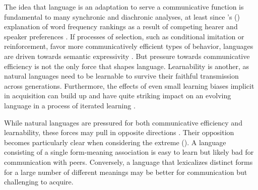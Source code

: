 \documentclass[a4paper, 11pt]{article}
\theoremstyle{Satz}
\newcommand{\citeposs}[2][]{\citeauthor{#2}'s (\citeyear[#1]{#2})}
\begin{document}
The idea that language is an adaptation to serve a communicative function is fundamental to
many synchronic and diachronic analyses, at least since \citeposs{zipf:1949} explanation of word
frequency rankings as a result of competing hearer and speaker preferences \citep[e.g.,
in][]{martinet:1962, horn:1984,jaeger+vRooij:2007,jaeger:2007,
  piantadosi:2014,kirby+etal:2015}. If processes of selection, such as conditional imitation or
reinforcement, favor more communicatively efficient types of behavior, languages are driven
towards semantic expressivity \citep[e.g.,][]{nowak+krakauer:1999,Skyrms2010:Signals}. But
pressure towards communicative efficiency is not the only force that shapes
language. Learnability is another, as natural languages need to be learnable to survive their
faithful transmission across generations. Furthermore, the effects of even small learning biases implicit in acquisition can build up and have quite striking impact on an evolving language in a process of iterated
learning
\citep{KirbyHurford2002:The-Emergence-o,SmithKirby2003:Iterated-Learni,kirby+etal:2014}.

While natural languages are pressured for both communicative efficiency and learnability, these forces may
pull in opposite directions \citep[\S7]{christiansen+chater:2008}. Their opposition becomes particularly clear when considering the
extreme (\citealt{kemp+regier:2012,kirby+etal:2015}). A language consisting of a single
form-meaning association is easy to learn but likely bad for communication with peers. Conversely, a language
that lexicalizes distinct forms for a large number of different meanings may be better for communication 
but challenging to acquire.
\end{document}
